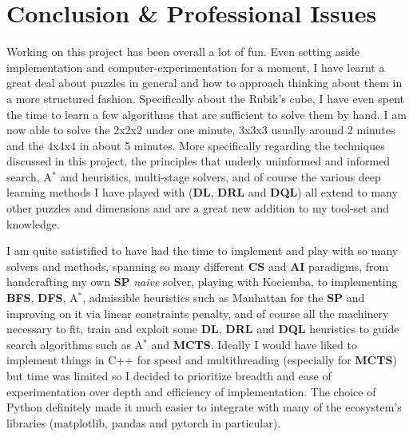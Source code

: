 
\chapter{Conclusion \& Professional Issues} %

\label{Conclusion} %



Working on this project has been overall a lot of fun. Even setting aside implementation and computer-experimentation for a moment, I have learnt a great deal about puzzles in general and how to approach thinking about them in a more structured fashion. Specifically about the Rubik's cube, I have even spent the time to learn a few algorithms that are sufficient to solve them by hand. I am now able to solve the 2x2x2 under one minute, 3x3x3 usually around 2 minutes and the 4x4x4 in about 5 minutes. More specifically regarding the techniques discussed in this project, the principles that underly uninformed and informed search, A$^{*}$ and heuristics, multi-stage solvers, and of course the various deep learning methods I have played with (\textbf{DL}, \textbf{DRL} and \textbf{DQL}) all extend to many other puzzles and dimensions and are a great new addition to my tool-set and knowledge.

I am quite satistified to have had the time to implement and play with so many solvers and methods, spanning so many different \textbf{CS} and \textbf{AI} paradigms, from handcrafting my own \textbf{SP} \textit{naive} solver, playing with Kociemba, to implementing \textbf{BFS}, \textbf{DFS}, A$^{*}$, admissible heuristics such as Manhattan for the \textbf{SP} and improving on it via linear constraints penalty, and of course all the machinery necessary to fit, train and exploit some \textbf{DL}, \textbf{DRL} and \textbf{DQL} heuristics to guide search algorithms such as  A$^{*}$ and \textbf{MCTS}. Ideally I would have liked to implement things in C++ for speed and multithreading (especially for \textbf{MCTS}) but time was limited so I decided to prioritize breadth and ease of experimentation over depth and efficiency of implementation. The choice of Python definitely made it much easier to integrate with many of the ecosystem's libraries (matplotlib, pandas and pytorch in particular).

